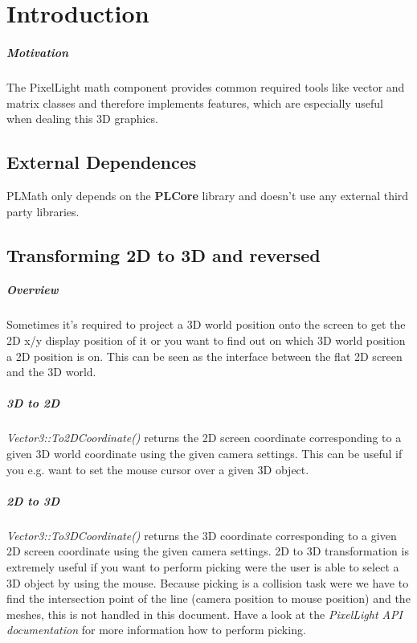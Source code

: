 \chapter{Introduction}


\paragraph{Motivation}
The PixelLight math component provides common required tools like vector and matrix classes and therefore implements features, which are especially useful when dealing this 3D graphics.




\section{External Dependences}
PLMath only depends on the \textbf{PLCore} library and doesn't use any external third party libraries.




\section{Transforming 2D to 3D and reversed}


\paragraph{Overview}
Sometimes it's required to project a 3D world position onto the screen to get the 2D x/y display position of it or you want to find out on which 3D world position a 2D position is on. This can be seen as the interface between the flat 2D screen and the 3D world.


\paragraph{3D to 2D}
\emph{Vector3::To2DCoordinate()} returns the 2D screen coordinate corresponding to a given 3D world coordinate using the given camera settings. This can be useful if you e.g. want to set the mouse cursor over a given 3D object.


\paragraph{2D to 3D}
\emph{Vector3::To3DCoordinate()} returns the 3D coordinate corresponding to a given 2D screen coordinate using the given camera settings. 2D to 3D transformation is extremely useful if you want to perform picking were the user is able to select a 3D object by using the mouse. Because picking is a collision task were we have to find the intersection point of the line (camera position to mouse position) and the meshes, this is not handled in this document. Have a look at the \emph{PixelLight API documentation} for more information how to perform picking.





